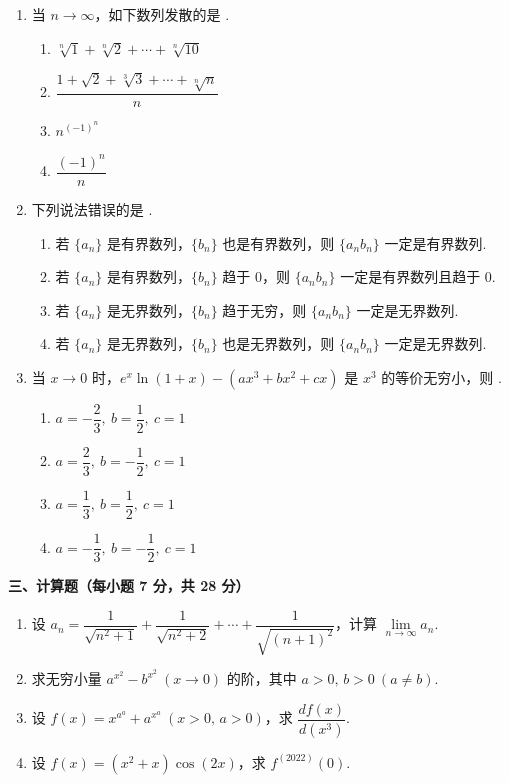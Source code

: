 \documentclass[a4paper,11pt]{ctexart}
\newcommand{\blank}[1][2.6cm]{\underline{\hspace{#1}}}
\begin{document}
\begin{enumerate}[label=\arabic*., leftmargin=2em, itemsep=0.8em, topsep=0.5em]
  \item 当 $n\to\infty$，如下数列发散的是 \blank[1.8cm].
  \begin{enumerate}[label=\Alph*., leftmargin=2.2em, itemsep=0.3em, topsep=0.3em]
    \item $\sqrt[n]{1}+\sqrt[n]{2}+\cdots+\sqrt[n]{10}$
    \item $\dfrac{1+\sqrt{2}+\sqrt[3]{3}+\cdots+\sqrt[n]{n}}{n}$
    \item $n^{(-1)^n}$
    \item $\dfrac{(-1)^n}{n}$
  \end{enumerate}

  \item 下列说法错误的是 \blank[1.8cm].
  \begin{enumerate}[label=\Alph*., leftmargin=2.2em, itemsep=0.3em, topsep=0.3em]
    \item 若 $\{a_n\}$ 是有界数列，$\{b_n\}$ 也是有界数列，则 $\{a_nb_n\}$ 一定是有界数列.
    \item 若 $\{a_n\}$ 是有界数列，$\{b_n\}$ 趋于 $0$，则 $\{a_nb_n\}$ 一定是有界数列且趋于 $0$.
    \item 若 $\{a_n\}$ 是无界数列，$\{b_n\}$ 趋于无穷，则 $\{a_nb_n\}$ 一定是无界数列.
    \item 若 $\{a_n\}$ 是无界数列，$\{b_n\}$ 也是无界数列，则 $\{a_nb_n\}$ 一定是无界数列.
  \end{enumerate}

  \item 当 $x\to 0$ 时，$e^x\ln(1+x)-(ax^3+bx^2+cx)$ 是 $x^3$ 的等价无穷小，则 \blank[1.8cm].
  \begin{enumerate}[label=\Alph*., leftmargin=2.2em, itemsep=0.3em, topsep=0.3em]
    \item $a=-\dfrac{2}{3},\ b=\dfrac{1}{2},\ c=1$
    \item $a=\dfrac{2}{3},\ b=-\dfrac{1}{2},\ c=1$
    \item $a=\dfrac{1}{3},\ b=\dfrac{1}{2},\ c=1$
    \item $a=-\dfrac{1}{3},\ b=-\dfrac{1}{2},\ c=1$
  \end{enumerate}
\end{enumerate}

\vspace{0.8em}
\textbf{三、计算题（每小题 7 分，共 28 分）}

\begin{enumerate}[label=\arabic*., leftmargin=2em, itemsep=0.9em, topsep=0.5em]
  \item 设 $a_n=\dfrac{1}{\sqrt{n^2+1}}+\dfrac{1}{\sqrt{n^2+2}}+\cdots+\dfrac{1}{\sqrt{(n+1)^2}}$，计算 $\lim\limits_{n\to\infty}a_n$.

  \item 求无穷小量 $a^{x^2}-b^{x^2}\ (x\to 0)$ 的阶，其中 $a>0,\,b>0\ (a\neq b)$.

  \item 设 $f(x)=x^{a^a}+a^{x^a}\ (x>0,\,a>0)$，求 $\dfrac{df(x)}{d(x^3)}$.

  \item 设 $f(x)=(x^2+x)\cos(2x)$，求 $f^{(2022)}(0)$.
\end{enumerate}
\end{document}
